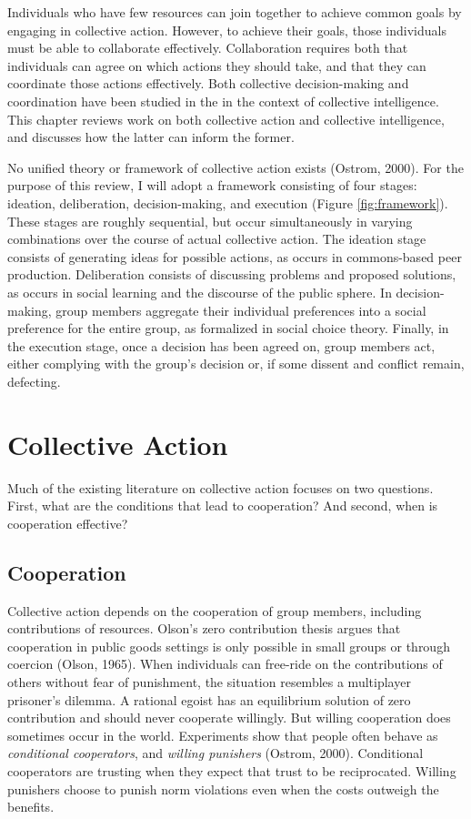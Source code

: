 Individuals who have few resources can join together to achieve common goals
by engaging in collective action.
However, to achieve their goals, those individuals must be able to collaborate
effectively.
Collaboration requires both that individuals can agree on which actions they
should take, and that they can coordinate those actions effectively.
Both collective decision-making and coordination
have been studied in the in the context of collective intelligence.
This chapter reviews work on both collective action and collective intelligence,
and discusses how the latter can inform the former.

No unified theory or framework of collective action exists (Ostrom, 2000).
For the purpose of this review,
I will adopt a framework consisting of four stages: ideation, deliberation,
decision-making, and execution (Figure \ref{fig:framework}).
These stages are roughly sequential, but occur simultaneously in varying combinations
over the course of actual collective action.
The ideation stage consists of generating ideas for possible actions,
as occurs in commons-based peer production.
Deliberation consists of discussing problems and proposed solutions,
as occurs in social learning and the discourse of the public sphere.
In decision-making, group members aggregate their individual preferences into
a social preference for the entire group, as formalized in social choice theory.
Finally, in the execution stage, once a decision has been agreed on, group members act,
either complying with the group's decision or, if some dissent and conflict remain, defecting.

\section{Collective Action}
Much of the existing literature on collective action focuses on two questions.
First, what are the conditions that lead to cooperation? And second, when is cooperation effective?

\subsection{Cooperation}
Collective action depends on the cooperation of group members, including contributions of resources. Olson's zero contribution thesis argues that cooperation in public goods settings is only possible in small groups or through coercion (Olson, 1965). When individuals can free-ride on the contributions of others without fear of punishment, the situation resembles a multiplayer prisoner's dilemma.
A rational egoist has an equilibrium solution of zero contribution
and should never cooperate willingly.
But willing cooperation does sometimes occur in the world. Experiments show that people often behave as {\em conditional cooperators},
and {\em willing punishers} (Ostrom, 2000). Conditional cooperators are trusting when they expect that trust to be reciprocated. Willing punishers choose to punish norm violations even when the costs outweigh the benefits.

